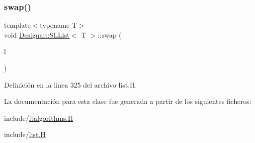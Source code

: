 \subsubsection{\texorpdfstring{swap()}{swap()}}
{\footnotesize\ttfamily template$<$typename T$>$ \\
void \hyperlink{class_designar_1_1_s_l_list}{Designar\+::\+S\+L\+List}$<$ T $>$\+::swap (\begin{DoxyParamCaption}\item[{\hyperlink{class_designar_1_1_s_l_list}{S\+L\+List}$<$ T $>$ \&}]{l }\end{DoxyParamCaption})\hspace{0.3cm}{\ttfamily [inline]}}



Definición en la línea 325 del archivo list.\+H.



La documentación para esta clase fue generada a partir de los siguientes ficheros\+:\begin{DoxyCompactItemize}
\item 
include/\hyperlink{italgorithms_8_h}{italgorithms.\+H}\item 
include/\hyperlink{list_8_h}{list.\+H}\end{DoxyCompactItemize}
